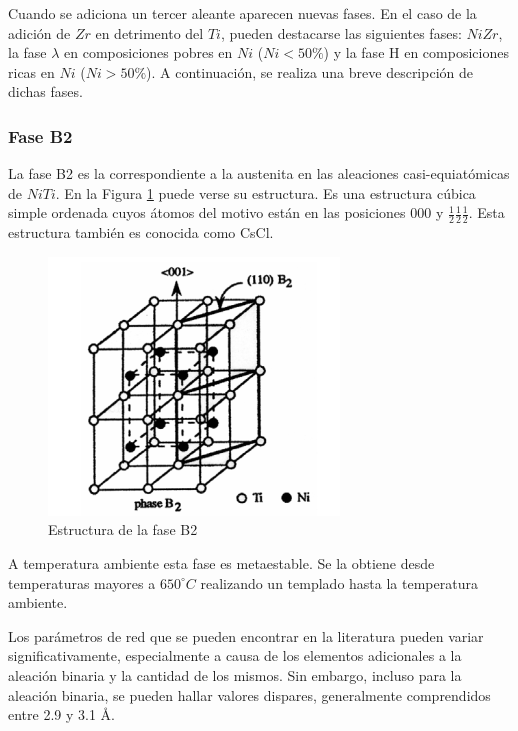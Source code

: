 \documentclass[12pt]{article}
\theoremstyle{definition}
\theoremstyle{remark}
\begin{document}
Cuando se adiciona un tercer aleante aparecen nuevas fases. En el caso de la adición de $Zr$ en detrimento del $Ti$, pueden destacarse las siguientes fases: $NiZr$, la fase $\lambda$ en composiciones pobres en $Ni$ ($Ni < 50\%$) y la fase H en composiciones ricas en $Ni$ ($Ni > 50\%$). A continuación, se realiza una breve descripción de dichas fases.

\subsubsection{Fase B2}
La fase B2 es la correspondiente a la austenita en las aleaciones casi-equiatómicas de $NiTi$. En la Figura \ref{B2phase} puede verse su estructura. Es una estructura cúbica simple ordenada cuyos átomos del motivo están en las posiciones 000 y $\frac{1}{2}\frac{1}{2}\frac{1}{2}$. Esta estructura también es conocida como CsCl.
\begin{figure}[H]
	\centering
	\includegraphics[scale=0.5]{img/B2Phase.png}
	\caption{Estructura de la fase B2}
	\label{B2phase}
\end{figure}

A temperatura ambiente esta fase es metaestable. Se la obtiene desde temperaturas mayores a $650 ^\circ C$ realizando un templado hasta la temperatura ambiente.

Los parámetros de red que se pueden encontrar en la literatura pueden variar significativamente, especialmente a causa de los elementos adicionales a la aleación binaria y la cantidad de los mismos. Sin embargo, incluso para la aleación binaria, se pueden hallar valores dispares, generalmente comprendidos entre 2.9 y 3.1 \AA.
\end{document}
